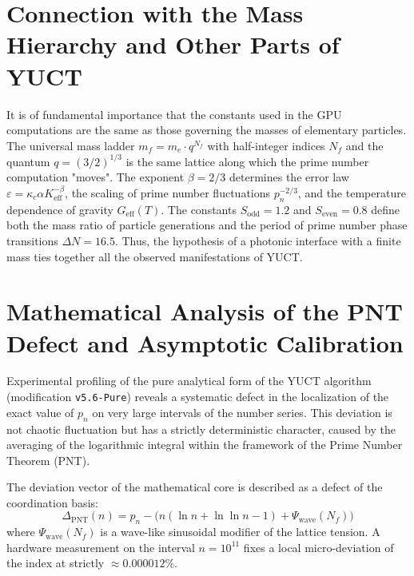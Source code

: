 \documentclass[11pt,a4paper]{article}
\begin{document}
	\section{Connection with the Mass Hierarchy and Other Parts of YUCT}
	It is of fundamental importance that the constants used in the GPU computations are the same as those governing the masses of elementary particles. The universal mass ladder $m_f = m_e \cdot q^{N_f}$ with half-integer indices $N_f$ and the quantum $q = (3/2)^{1/3}$ is the same lattice along which the prime number computation "moves". The exponent $\beta = 2/3$ determines the error law $\varepsilon = \kappa_c \alpha K_{\mathrm{eff}}^{-\beta}$, the scaling of prime number fluctuations $p_n^{-2/3}$, and the temperature dependence of gravity $G_{\mathrm{eff}}(T)$. The constants $S_{\mathrm{odd}} = 1.2$ and $S_{\mathrm{even}} = 0.8$ define both the mass ratio of particle generations and the period of prime number phase transitions $\Delta N = 16.5$. Thus, the hypothesis of a photonic interface with a finite mass ties together all the observed manifestations of YUCT.
	
	\section{Mathematical Analysis of the PNT Defect and Asymptotic Calibration}
	Experimental profiling of the pure analytical form of the YUCT algorithm (modification \texttt{v5.6-Pure}) reveals a systematic defect in the localization of the exact value of $p_n$ on very large intervals of the number series. This deviation is not chaotic fluctuation but has a strictly deterministic character, caused by the averaging of the logarithmic integral within the framework of the Prime Number Theorem (PNT).
	
	The deviation vector of the mathematical core is described as a defect of the coordination basis:
	\begin{equation}
		\Delta_{\mathrm{PNT}}(n) = p_n - \bigl( n(\ln n + \ln\ln n - 1) + \Psi_{\mathrm{wave}}(N_f) \bigr)
	\end{equation}
	where $\Psi_{\mathrm{wave}}(N_f)$ is a wave-like sinusoidal modifier of the lattice tension. A hardware measurement on the interval $n = 10^{11}$ fixes a local micro-deviation of the index at strictly $\approx 0.000012\%$.
	
\end{document}

